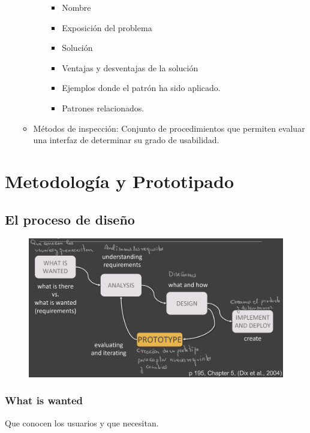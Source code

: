 \documentclass[12pt, twoside, openright]{report} %
\begin{document}
\begin{itemize}
\begin{itemize}
\begin{itemize}
        \begin{itemize}
        
        \item
          Nombre
        \item
          Exposición del problema
        \item
          Solución
        \item
          Ventajas y desventajas de la solución
        \item
          Ejemplos donde el patrón ha sido aplicado.
        \item
          Patrones relacionados.
        \end{itemize}
      \end{itemize}
    \item
      Métodos de inspección: Conjunto de procedimientos que permiten
      evaluar una interfaz de determinar su grado de usabilidad.
    \end{itemize}
  \end{itemize}
\pagebreak
\section{Metodología y Prototipado}
\subsection{El proceso de diseño}
\begin{figure}[H]
	{\includegraphics[scale=.18]{Untitled 3.png}}
\end{figure}
\subsubsection{What is wanted}
Que conocen los usuarios y que necesitan.
\end{document}
